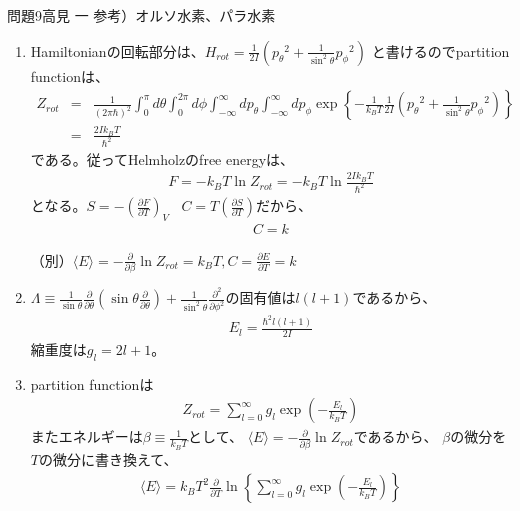\documentclass[fleqn]{jbook}
\begin{document}
\begin{answer}{問題9}{高見 一}
参考）オルソ水素、パラ水素
\begin{enumerate}

\item Hamiltonianの回転部分は、$\displaystyle H_{rot} = 
\frac{1}{2 I}\left( {p_{\theta}}^2 + \frac{1}{\sin ^2 \theta} {p_{\phi}}^2
 \right)$
と書けるのでpartition functionは、
\begin{eqnarray*}
Z_{rot} &=& \frac{1}{(2 \pi \hbar)^2} \int_0 ^\pi d\theta 
\int_0 ^{2 \pi} d\phi \int _{-\infty} ^ {\infty} dp_{\theta} 
\int _{-\infty} ^ {\infty} dp_{\phi} 
\exp \left\{ -\frac{1}{k_B T}\frac{1}{2I} 
\left( {p_{\theta}}^2 + \frac{1}{\sin ^2 \theta} {p_{\phi}}^2 \right) 
\right\}\\
&=& \frac{2 I k_B T}{\hbar^2}
\end{eqnarray*}
である。従ってHelmholzのfree energyは、
\begin{eqnarray*}
F = -k_B T \ln Z_{rot} = -k_B T \ln \frac{2 I k_B T}{\hbar^2}
\end{eqnarray*}
となる。$\displaystyle S = -\left( \frac{\partial F}{\partial T} 
\right)_V ~~~~ C = T \left( \frac{\partial S}{\partial T} \right)$だから、
\begin{eqnarray*}
C = k
\end{eqnarray*}

（別）$\displaystyle \langle E\rangle = - \frac{\partial}{\partial \beta} \ln Z_{rot} = k_BT
, C = \frac{\partial E}{\partial T} = k$

\item $\displaystyle \Lambda \equiv \frac{1}{\sin \theta} 
\frac{\partial}{\partial \theta}\left( \sin \theta 
\frac{\partial}{\partial \theta} \right) + \frac{1}{\sin^2 \theta}
\frac{\partial^2}{\partial \phi^2}$の固有値は$l(l + 1)$であるから、
\begin{eqnarray*}
E_l = \frac{\hbar^2 l(l + 1)}{2 I}
\end{eqnarray*}
縮重度は$g_l = 2l + 1$。

\item partition functionは
\begin{eqnarray*}
Z_{rot} = \sum_{l=0}^{\infty} g_l \exp \left(- \frac{E_l}{k_BT} \right)
\end{eqnarray*}
またエネルギーは$\displaystyle \beta \equiv \frac{1}{k_BT}$として、
$\displaystyle \langle E\rangle = - \frac{\partial}{\partial \beta} \ln Z_{rot}$であるから、
$\beta$の微分を$T$の微分に書き換えて、
\begin{eqnarray*}
\langle E\rangle = k_B T^2 \frac{\partial}{\partial T} \ln \left\{ \sum_{l=0}^{\infty}
g_l \exp \left(- \frac{E_l}{k_BT} \right)\right\}
\end{eqnarray*}


\end{enumerate}
\end{answer}
\end{document}

